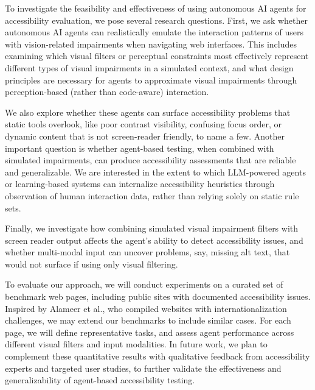 To investigate the feasibility and effectiveness of using autonomous AI agents for accessibility evaluation, we pose several research questions. First, we ask whether autonomous AI agents can realistically emulate the interaction patterns of users with vision-related impairments when navigating web interfaces. This includes examining which visual filters or perceptual constraints most effectively represent different types of visual impairments in a simulated context, and what design principles are necessary for agents to approximate visual impairments through perception-based (rather than code-aware) interaction.

We also explore whether these agents can surface accessibility problems that static tools overlook, like poor contrast visibility, confusing focus order, or dynamic content that is not screen-reader friendly, to name a few. Another important question is whether agent-based testing, when combined with simulated impairments, can produce accessibility assessments that are reliable and generalizable. We are interested in the extent to which LLM-powered agents or learning-based systems can internalize accessibility heuristics through observation of human interaction data, rather than relying solely on static rule sets.

Finally, we investigate how combining simulated visual impairment filters with screen reader output affects the agent's ability to detect accessibility issues, and whether multi-modal input can uncover problems, say, missing alt text, that would not surface if using only visual filtering.

To evaluate our approach, we will conduct experiments on a curated set of benchmark web pages, including public sites with documented accessibility issues. Inspired by Alameer et al.\cite{alameer2016detecting}, who compiled websites with internationalization challenges, we may extend our benchmarks to include similar cases. For each page, we will define representative tasks, and assess agent performance across different visual filters and input modalities. In future work, we plan to complement these quantitative results with qualitative feedback from accessibility experts and targeted user studies, to further validate the effectiveness and generalizability of agent-based accessibility testing.


